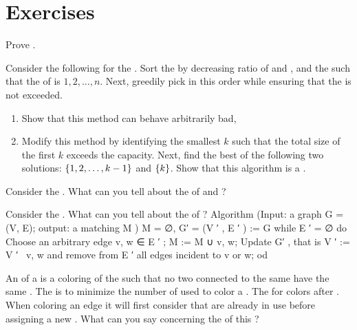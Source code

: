 \section*{Exercises}
\begin{exercise}
Prove .
\end{exercise}

\begin{exercise}
Consider the following  for the . Sort the  by decreasing ratio of  and , and  the  such that the  of  is $1,2,\ldots,n$. Next, greedily pick  in this order while ensuring that the  is not exceeded.
\begin{enumerate}
 \item Show that this method can behave arbitrarily bad,
 \item Modify this method by identifying the smallest $k$ such that the total size of the first $k$  exceeds the capacity. Next, find the best of the following two solutions: $\left\{ 1,2,\ldots,k-1 \right\}$ and $\left\{ k \right\}$.
Show that this algorithm is a .
\end{enumerate}
\end{exercise}

\begin{exercise}
Consider the . What can you tell about the  of  and ?
\end{exercise}

\begin{exercise}
Consider the . What can you tell about the  of ?
Algorithm (Input: a graph G = (V, E); output: a matching M )
M = ∅, G′ = (V ′ , E ′ ) := G
while E ′ = ∅
do
Choose an arbitrary edge {v, w} ∈ E ′ ;
M := M ∪ {v, w};
Update G′ , that is V ′ := V ′ \ {v, w} and remove from E ′ all edges incident to v or w;
od
\end{exercise}

\begin{exercise}
An  of a  is a coloring of the  such that no two  connected to the same  have the same . The  is to minimize the number of  used to color a . The  for  colors  after . When coloring an edge it will first consider  that are already in use before assigning a new . What can you say concerning the  of this ?
\end{exercise}

